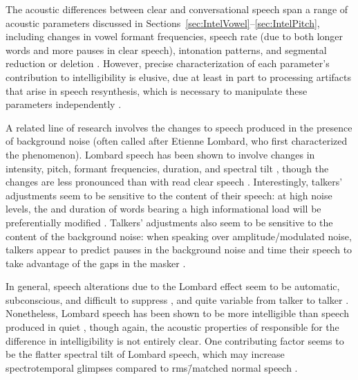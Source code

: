The acoustic differences between clear and conversational speech span a range of acoustic parameters discussed in Sections~\ref{sec:IntelVowel}–\ref{sec:IntelPitch}, including changes in vowel formant frequencies, speech rate (due to both longer words and more pauses in clear speech), intonation patterns, and segmental reduction or deletion \citep[see][\intal]{PichenyEtAl1986, LiLoizou2008, SmiljanicBradlow2008, HazanBaker2011}.  However, precise characterization of each parameter’s contribution to intelligibility is elusive, due at least in part to processing artifacts that arise in speech resynthesis, which is necessary to manipulate these parameters independently \citep[cf. discussions in][]{PichenyEtAl1989, UchanskiEtAl1996, LiuZeng2006, KrauseBraida2009}.

A related line of research involves the changes to speech produced in the presence of background noise (often called  after Etienne Lombard, who first characterized the phenomenon).  Lombard speech has been shown to involve changes in intensity, pitch, formant frequencies, duration, and spectral tilt \citep{LaneTranel1971, SummersEtAl1988, LuCooke2008}, though the changes are less pronounced than with read clear speech \citep{HazanBaker2011}.  Interestingly, talkers’ adjustments seem to be sensitive to the content of their speech: at high noise levels, the \fo{} and duration of words bearing a high informational load will be preferentially modified \citep{PatelSchell2008}.  Talkers’ adjustments also seem to be sensitive to the content of the background noise: when speaking over amplitude\-/modulated noise, talkers appear to predict pauses in the background noise and time their speech to take advantage of the gaps in the masker \citep{CookeLu2010}.  

In general, speech alterations due to the Lombard effect seem to be automatic, subconscious, and difficult to suppress \citep{PickEtAl1989}, and quite variable from talker to talker \citep{Junqua1993}.  Nonetheless, Lombard speech has been shown to be more intelligible than speech produced in quiet \citep{DreherONeill1957, SummersEtAl1988}, though again, the acoustic properties of responsible for the difference in intelligibility is not entirely clear.  One contributing factor seems to be the flatter spectral tilt of Lombard speech, which may increase spectrotemporal glimpses compared to \ac{rms}\=/matched normal speech \citep{LuCooke2009}.


